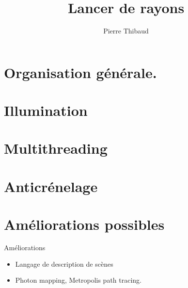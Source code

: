 \documentclass[10pt,a4paper]{beamer}
\author{Pierre \bsc{Donat-Bouillud} Thibaud \bsc{Ehret}}
\title{Lancer de rayons}
\begin{document}
\frame{\titlepage}

\frame{\tableofcontents}

\section{Organisation générale.}


\frame{\tableofcontents}

\section{Illumination}


\frame{\tableofcontents}

\section{Multithreading} 


\frame{\tableofcontents}

\section{Anticrénelage}


\section{Améliorations possibles}

\begin{frame}{Améliorations}
\begin{itemize}
\item Langage de description de scènes
\item Photon mapping, Metropolis path tracing.
\end{itemize}
\end{frame}
\end{document}
